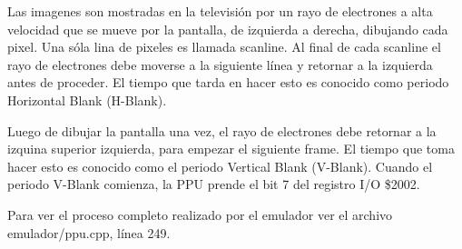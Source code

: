 Las imagenes son mostradas en la televisión por un rayo de electrones a alta velocidad que se mueve por la pantalla, de izquierda a derecha, dibujando cada pixel. Una sóla lina de pixeles es llamada scanline. Al final de cada scanline el rayo de electrones debe moverse a la siguiente línea y retornar a la izquierda antes de proceder. El tiempo que tarda en hacer esto es conocido como periodo Horizontal Blank (H-Blank).

Luego de dibujar la pantalla una vez, el rayo de electrones debe retornar a la izquina superior izquierda, para empezar el siguiente frame. El tiempo que toma hacer esto es conocido como el periodo Vertical Blank (V-Blank). Cuando el periodo V-Blank comienza, la PPU prende el bit 7 del registro I/O \$2002.

Para ver el proceso completo realizado por el emulador ver el archivo emulador/ppu.cpp, línea 249.



